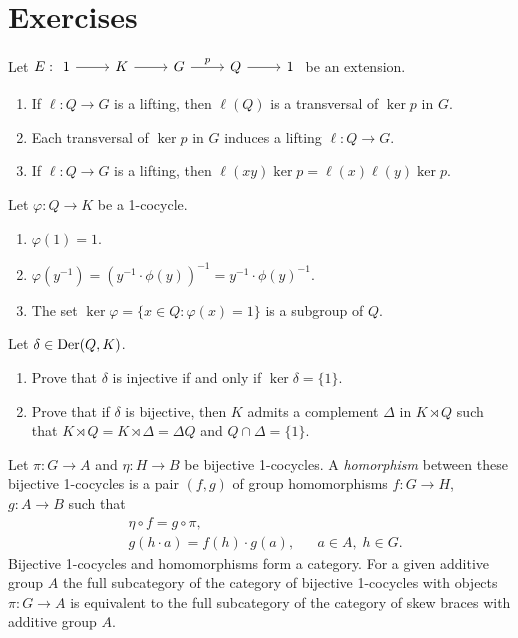\section*{Exercises}

\begin{prob}
	\label{xca:lifting}
	Let $E:
	\begin{tikzcd}
	1 & K & G & Q & 1
	\arrow[from=1-1, to=1-2]
	\arrow[from=1-2, to=1-3]
	\arrow["p", from=1-3, to=1-4]
	\arrow[from=1-4, to=1-5]
    \end{tikzcd}$
	be an extension. 
	\begin{enumerate}
		\item If $\ell\colon Q\to G$ is a lifting, then $\ell(Q)$
			is a transversal of $\ker p$ in $G$.
		\item Each transversal of $\ker p$ in $G$ induces a lifting $\ell\colon
			Q\to G$.
		\item If $\ell\colon Q\to G$ is a lifting, then 
			$\ell(xy)\ker p=\ell(x)\ell(y)\ker p$.
	\end{enumerate}
\end{prob}

\begin{prob}
	\label{xca:1cocycle}
	Let $\varphi\colon Q\to K$ be a 1-cocycle. 
	\begin{enumerate}
		\item $\varphi(1)=1$.
		\item $\varphi(y^{-1})=(y^{-1}\cdot\phi(y))^{-1}=y^{-1}\cdot\phi(y)^{-1}$.
		\item The set $\ker\varphi=\{x\in Q:\varphi(x)=1\}$ is a subgroup of $Q$. 
	\end{enumerate}
\end{prob}

\begin{prob}
	\label{xca:ker1cocycle}
	Let $\delta\in\operatorname{Der}(Q,K)$. 
	\begin{enumerate}
	\item Prove that $\delta$ is injective if and only if 
	$\ker\delta=\{1\}$.
	\item Prove that if $\delta$ is bijective, then  
	$K$ admits a complement 
	$\Delta$ in $K\rtimes Q$ such that $K\rtimes Q=K\rtimes\Delta=\Delta Q$ and 
	$Q\cap\Delta=\{1\}$.
	\end{enumerate}
\end{prob}


\begin{exercise}
\label{xca:1cocycle}
Let $\pi\colon G\to A$ and $\eta\colon H\to B$ be bijective 1-cocycles.  A
\emph{homorphism} between these bijective 1-cocycles is a pair $(f,g)$ of
group homomorphisms  $f\colon G\to H$, $g\colon A\to B$ such that
\begin{align*}
&\eta\circ f=g\circ \pi,\\
&g(h\cdot a)=f(h)\cdot g(a),&&a\in A,\;h\in G.
\end{align*}
Bijective 1-cocycles and homomorphisms form a category. 
For a given additive group $A$ 
the full subcategory of the category of bijective 1-cocycles with objects
$\pi\colon G\to A$ is equivalent to the full subcategory of the category of
skew braces with additive group $A$. 
\end{exercise}


